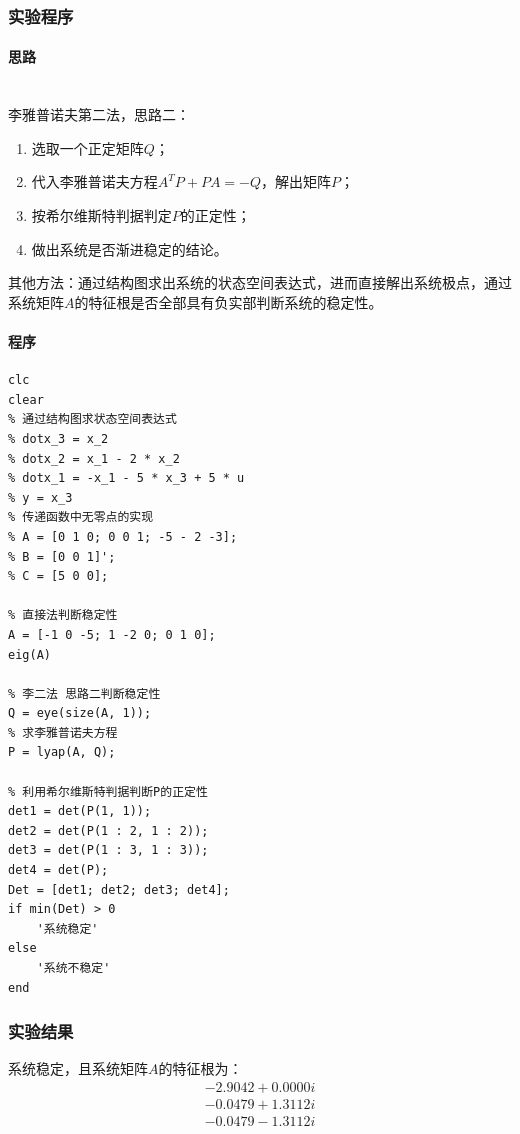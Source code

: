 \documentclass[UTF8]{article}
\begin{document}
\subsubsection{实验程序}
\paragraph{思路}~{}
\\
李雅普诺夫第二法，思路二：
\begin{enumerate}
    \item 选取一个正定矩阵$Q$；
    \item 代入李雅普诺夫方程$A^TP + PA = -Q$，解出矩阵$P$；
    \item 按希尔维斯特判据判定$P$的正定性；
    \item 做出系统是否渐进稳定的结论。
\end{enumerate}
其他方法：通过结构图求出系统的状态空间表达式，进而直接解出系统极点，通过系统矩阵$A$的特征根是否全部具有负实部判断系统的稳定性。

\paragraph{程序}
\begin{lstlisting}
clc
clear
% 通过结构图求状态空间表达式
% dotx_3 = x_2 
% dotx_2 = x_1 - 2 * x_2
% dotx_1 = -x_1 - 5 * x_3 + 5 * u
% y = x_3
% 传递函数中无零点的实现
% A = [0 1 0; 0 0 1; -5 - 2 -3];
% B = [0 0 1]';
% C = [5 0 0];

% 直接法判断稳定性
A = [-1 0 -5; 1 -2 0; 0 1 0];
eig(A)

% 李二法 思路二判断稳定性
Q = eye(size(A, 1));
% 求李雅普诺夫方程
P = lyap(A, Q);

% 利用希尔维斯特判据判断P的正定性
det1 = det(P(1, 1));
det2 = det(P(1 : 2, 1 : 2));
det3 = det(P(1 : 3, 1 : 3));
det4 = det(P);
Det = [det1; det2; det3; det4];
if min(Det) > 0
    '系统稳定'
else
    '系统不稳定'
end
\end{lstlisting}

\subsubsection{实验结果}
系统稳定，且系统矩阵$A$的特征根为：
\begin{align*}
    -2.9042 + 0.0000i \\
    -0.0479 + 1.3112i \\
    -0.0479 - 1.3112i    
\end{align*}
\end{document}
